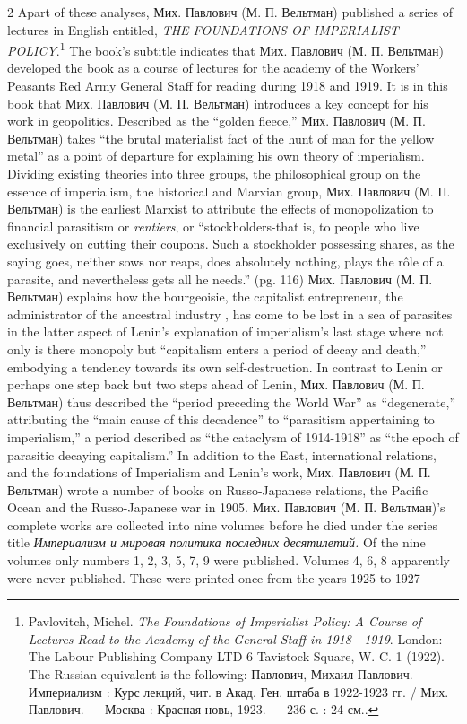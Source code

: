 \documentclass[10pt,a4paper,twoside]{article} %
\begin{document}
\begin{multicols}{2}
 \newline \indent Apart of these analyses, \textrussian{Мих. Павлович (М. П. Вельтман)} published a series of lectures in English entitled, \emph{THE FOUNDATIONS OF IMPERIALIST POLICY}.\footnote{Pavlovitch, Michel. \emph{The Foundations of Imperialist Policy: A Course of Lectures Read to the Academy of the General Staff in 1918—1919}.  London: The Labour Publishing Company LTD 6 Tavistock Square, W. C. 1 (1922). The Russian equivalent is the following: Павлович, Михаил Павлович. Империализм : Курс лекций, чит. в Акад. Ген. штаба в 1922-1923 гг. / Мих. Павлович. — Москва : Красная новь, 1923. — 236 с. : 24 см..} The book’s subtitle indicates that \textrussian{Мих. Павлович (М. П. Вельтман)} developed the book as a course of lectures for the academy of the Workers’ Peasants Red Army General Staff for reading during 1918 and 1919. It is in this book that \textrussian{Мих. Павлович (М. П. Вельтман)} introduces a key concept for his work in geopolitics. Described as the “golden fleece,”  \textrussian{Мих. Павлович (М. П. Вельтман)} takes “the brutal materialist fact of the hunt of man for the yellow metal” as a point of departure for explaining his own theory of imperialism. Dividing existing theories into three groups, the philosophical group on the essence of imperialism, the historical and Marxian group, \textrussian{Мих. Павлович (М. П. Вельтман)} is the earliest Marxist to attribute the effects of monopolization to financial parasitism or \emph{rentiers}, or “stockholders-that is, to people who live exclusively on cutting their coupons. Such a stockholder possessing shares, as the saying goes, neither sows nor reaps, does absolutely nothing, plays the rôle of a parasite, and nevertheless gets all he needs.” (pg. 116) \textrussian{Мих. Павлович (М. П. Вельтман)} explains how the bourgeoisie, the capitalist entrepreneur, the administrator of the ancestral industry , has come to be lost in a sea of parasites in the latter aspect of Lenin’s explanation of imperialism’s last stage where not only is there monopoly but “capitalism enters a period of decay and death,” embodying a tendency towards its own self-destruction. In contrast to Lenin or perhaps one step back but two steps ahead of Lenin, \textrussian{Мих. Павлович (М. П. Вельтман)} thus described the “period preceding the World War” as “degenerate,” attributing the “main cause of this decadence” to “parasitism appertaining to imperialism,” a period described as “the cataclysm of 1914-1918” as “the epoch of parasitic decaying capitalism.”  \newline \indent In addition to the East, international relations, and the foundations of Imperialism and Lenin’s work, \textrussian{Мих. Павлович (М. П. Вельтман)} wrote a number of books on  Russo-Japanese relations, the Pacific Ocean and the Russo-Japanese war in 1905. \textrussian{Мих. Павлович (М. П. Вельтман)}’s complete works are collected into nine volumes before he died under the series title \textrussian{\emph{Империализм и мировая политика последних десятилетий.}} Of the nine volumes only numbers 1, 2, 3, 5, 7, 9 were published. Volumes 4, 6, 8 apparently were never published. These were printed once from the years 1925 to 1927 
\end{multicols}
\end{document}
